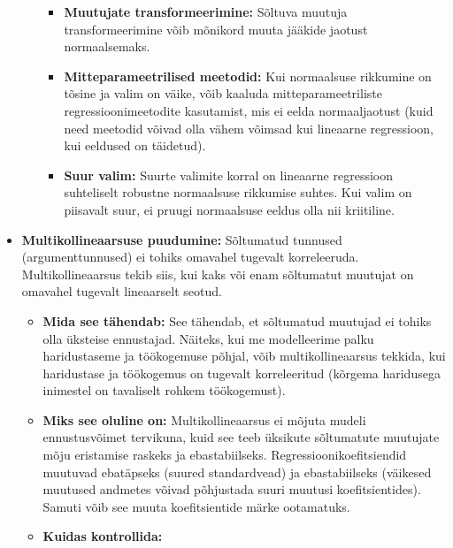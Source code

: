\documentclass[
]{book}
\providecommand{\tightlist}{%
  \setlength{\itemsep}{0pt}\setlength{\parskip}{0pt}}
\begin{document}
\begin{itemize}
\begin{itemize}
    \begin{itemize}
    \tightlist
    \item
      \textbf{Muutujate transformeerimine:} Sõltuva muutuja transformeerimine võib mõnikord muuta jääkide jaotust normaalsemaks.
    \item
      \textbf{Mitteparameetrilised meetodid:} Kui normaalsuse rikkumine on tõsine ja valim on väike, võib kaaluda mitteparameetriliste regressioonimeetodite kasutamist, mis ei eelda normaaljaotust (kuid need meetodid võivad olla vähem võimsad kui lineaarne regressioon, kui eeldused on täidetud).
    \item
      \textbf{Suur valim:} Suurte valimite korral on lineaarne regressioon suhteliselt robustne normaalsuse rikkumise suhtes. Kui valim on piisavalt suur, ei pruugi normaalsuse eeldus olla nii kriitiline.
    \end{itemize}
  \end{itemize}
\item
  \textbf{Multikollineaarsuse puudumine:} Sõltumatud tunnused (argumenttunnused) ei tohiks omavahel tugevalt korreleeruda. Multikollineaarsus tekib siis, kui kaks või enam sõltumatut muutujat on omavahel tugevalt lineaarselt seotud.

  \begin{itemize}
  \tightlist
  \item
    \textbf{Mida see tähendab:} See tähendab, et sõltumatud muutujad ei tohiks olla üksteise ennustajad. Näiteks, kui me modelleerime palku haridustaseme ja töökogemuse põhjal, võib multikollineaarsus tekkida, kui haridustase ja töökogemus on tugevalt korreleeritud (kõrgema haridusega inimestel on tavaliselt rohkem töökogemust).
  \item
    \textbf{Miks see oluline on:} Multikollineaarsus ei mõjuta mudeli ennustusvõimet tervikuna, kuid see teeb üksikute sõltumatute muutujate mõju eristamise raskeks ja ebastabiilseks. Regressioonikoefitsiendid muutuvad ebatäpseks (suured standardvead) ja ebastabiilseks (väikesed muutused andmetes võivad põhjustada suuri muutusi koefitsientides). Samuti võib see muuta koefitsientide märke ootamatuks.
  \item
    \textbf{Kuidas kontrollida:}


\end{itemize}
\end{itemize}
\end{document}
